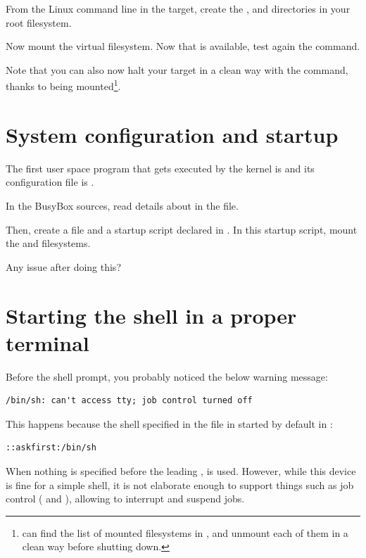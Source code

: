 From the Linux command line in the target, create the ,
 and  directories in your root filesystem.

Now mount the  virtual filesystem. Now that  is
available, test again the  command.

Note that you can also now halt your target in a clean way with the 
command, thanks to  being mounted\footnote{
can find the list of mounted filesystems in , and
unmount each of them in a clean way before shutting down.}.

\section{System configuration and startup}

The first user space program that gets executed by the kernel is
 and its configuration file is .

In the BusyBox sources, read details about  in the
 file.

Then, create a  file and a 
startup script declared in . In this startup
script, mount the  and  filesystems.

Any issue after doing this?

\section{Starting the shell in a proper terminal}

Before the shell prompt, you probably noticed the below warning message:

\begin{verbatim}
/bin/sh: can't access tty; job control turned off
\end{verbatim}

This happens because the shell specified in the  file
in started by default in :

\begin{verbatim}
::askfirst:/bin/sh
\end{verbatim}

When nothing is specified before the leading \code{::}, 
is used. However, while this device is fine for a simple shell, it is
not elaborate enough to support things such as job control
(\code{[Ctrl][c]} and \code{[Ctrl][z]}), allowing to interrupt and
suspend jobs.

